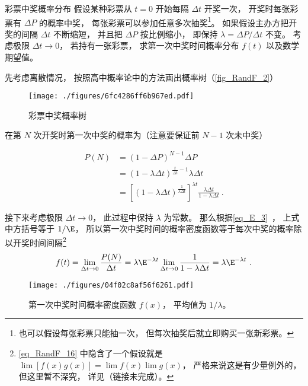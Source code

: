 \begin{example}{彩票中奖概率分布}
假设某种彩票从 $t = 0$ 开始每隔 $\Delta t$ 开奖一次， 开奖时每张彩票有 $\Delta P$ 的概率中奖， 每张彩票可以参加任意多次抽奖\footnote{也可以假设每张彩票只能抽一次， 但每次抽奖后就立即购买一张新彩票。}。 如果假设主办方把开奖的间隔 $\Delta t$ 不断缩短， 并且把 $\Delta P$ 按比例缩小， 即保持 $\lambda = {\Delta P}/{\Delta t}$ 不变。 考虑极限 $\Delta t\to 0$， 若持有一张彩票， 求第一次中奖时间概率分布 $f(t)$ 以及数学期望值。

先考虑离散情况， 按照高中概率论中的方法画出概率树（\autoref{fig_RandF_2}）
\begin{figure}[ht]
\centering
\texttt{[image: ./figures/6fc4286ff6b967ed.pdf]}
\caption{彩票中奖概率树} \label{fig_RandF_2}
\end{figure}
在第 $N$ 次开奖时第一次中奖的概率为（注意要保证前 $N-1$ 次未中奖）

\begin{equation}
\begin{aligned}
P(N) &= (1-\Delta P)^{N-1} \Delta P\\
&= (1-\lambda\Delta t)^{\frac{t}{\Delta t}-1} \lambda\Delta t\\
&= [(1-\lambda\Delta t)^{\frac{1}{\lambda\Delta t}}]^{\lambda t} \frac{\lambda\Delta t}{1-\lambda\Delta t}~.
\end{aligned}
\end{equation}

接下来考虑极限 $\Delta t\to 0$， 此过程中保持 $\lambda$ 为常数。 那么根据\autoref{eq_E_3}~， 上式中方括号等于 $1/\E$， 所以第一次中奖时间的概率密度函数等于每次中奖的概率除以开奖时间间隔\footnote{\autoref{eq_RandF_16} 中隐含了一个假设就是 $\lim [f(x)g(x)] = \lim f(x) \lim g(x)$， 严格来说这是有少量例外的， 但这里暂不深究， 详见（链接未完成）。}
\begin{equation}\label{eq_RandF_16}
f(t) = \lim_{\Delta t\to 0} \frac{P(N)}{\Delta t} = \lambda\E^{-\lambda t}\lim_{\Delta t\to 0} \frac{1}{1-\lambda\Delta t} = \lambda\E^{-\lambda t}~.
\end{equation}


\begin{figure}[ht]
\centering
\texttt{[image: ./figures/04f02c8af56f6261.pdf]}
\caption{第一次中奖时间概率密度函数 $f(x)$， 平均值为 $1/\lambda$。} \label{fig_RandF_3}
\end{figure}


\end{example}
